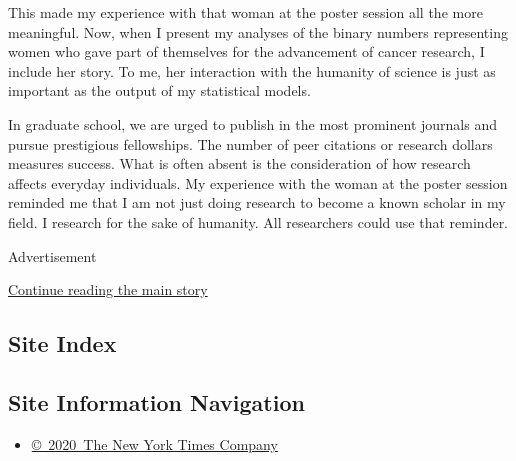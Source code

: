 This made my experience with that woman at the poster session all the
more meaningful. Now, when I present my analyses of the binary numbers
representing women who gave part of themselves for the advancement of
cancer research, I include her story. To me, her interaction with the
humanity of science is just as important as the output of my statistical
models.

In graduate school, we are urged to publish in the most prominent
journals and pursue prestigious fellowships. The number of peer
citations or research dollars measures success. What is often absent is
the consideration of how research affects everyday individuals. My
experience with the woman at the poster session reminded me that I am
not just doing research to become a known scholar in my field. I
research for the sake of humanity. All researchers could use that
reminder.

Advertisement

\protect\hyperlink{after-bottom}{Continue reading the main story}

\hypertarget{site-index}{%
\subsection{Site Index}\label{site-index}}

\hypertarget{site-information-navigation}{%
\subsection{Site Information
Navigation}\label{site-information-navigation}}

\begin{itemize}
\tightlist
\item
  \href{https://help.nytimes.com/hc/en-us/articles/115014792127-Copyright-notice}{©~2020~The
  New York Times Company}
\end{itemize}

